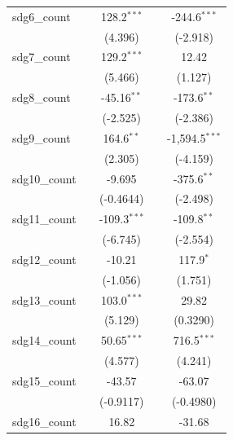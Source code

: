 \begin{tabular}{lcccc}
   sdg6\_count       &                & 128.2$^{***}$  &                & -244.6$^{***}$\\   
                     &                & (4.396)        &                & (-2.918)\\   
   sdg7\_count       &                & 129.2$^{***}$  &                & 12.42\\   
                     &                & (5.466)        &                & (1.127)\\   
   sdg8\_count       &                & -45.16$^{**}$  &                & -173.6$^{**}$\\   
                     &                & (-2.525)       &                & (-2.386)\\   
   sdg9\_count       &                & 164.6$^{**}$   &                & -1,594.5$^{***}$\\   
                     &                & (2.305)        &                & (-4.159)\\   
   sdg10\_count      &                & -9.695         &                & -375.6$^{**}$\\   
                     &                & (-0.4644)      &                & (-2.498)\\   
   sdg11\_count      &                & -109.3$^{***}$ &                & -109.8$^{**}$\\   
                     &                & (-6.745)       &                & (-2.554)\\   
   sdg12\_count      &                & -10.21         &                & 117.9$^{*}$\\   
                     &                & (-1.056)       &                & (1.751)\\   
   sdg13\_count      &                & 103.0$^{***}$  &                & 29.82\\   
                     &                & (5.129)        &                & (0.3290)\\   
   sdg14\_count      &                & 50.65$^{***}$  &                & 716.5$^{***}$\\   
                     &                & (4.577)        &                & (4.241)\\   
   sdg15\_count      &                & -43.57         &                & -63.07\\   
                     &                & (-0.9117)      &                & (-0.4980)\\   
   sdg16\_count      &                & 16.82          &                & -31.68\\   

\end{tabular}
